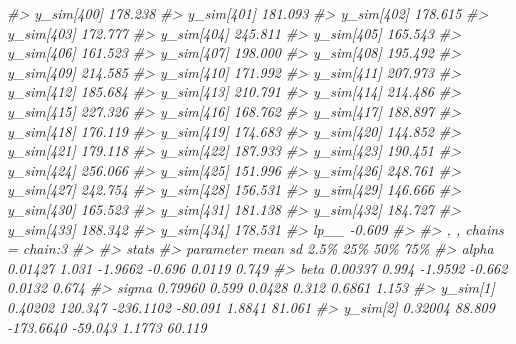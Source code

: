 \documentclass[
  10pt,
  italian,
  a4paper,
  extrafontsizes,onecolumn,openright
  ]{memoir}
\newenvironment{Shaded}{\begin{snugshade}}{\end{snugshade}}
\newcommand{\CommentTok}[1]{\textcolor[rgb]{0.56,0.35,0.01}{\textit{#1}}}
\begin{document}
\begin{Shaded}
\begin{Highlighting}[]
\CommentTok{\#\textgreater{}   y\_sim[400] 178.238}
\CommentTok{\#\textgreater{}   y\_sim[401] 181.093}
\CommentTok{\#\textgreater{}   y\_sim[402] 178.615}
\CommentTok{\#\textgreater{}   y\_sim[403] 172.777}
\CommentTok{\#\textgreater{}   y\_sim[404] 245.811}
\CommentTok{\#\textgreater{}   y\_sim[405] 165.543}
\CommentTok{\#\textgreater{}   y\_sim[406] 161.523}
\CommentTok{\#\textgreater{}   y\_sim[407] 198.000}
\CommentTok{\#\textgreater{}   y\_sim[408] 195.492}
\CommentTok{\#\textgreater{}   y\_sim[409] 214.585}
\CommentTok{\#\textgreater{}   y\_sim[410] 171.992}
\CommentTok{\#\textgreater{}   y\_sim[411] 207.973}
\CommentTok{\#\textgreater{}   y\_sim[412] 185.684}
\CommentTok{\#\textgreater{}   y\_sim[413] 210.791}
\CommentTok{\#\textgreater{}   y\_sim[414] 214.486}
\CommentTok{\#\textgreater{}   y\_sim[415] 227.326}
\CommentTok{\#\textgreater{}   y\_sim[416] 168.762}
\CommentTok{\#\textgreater{}   y\_sim[417] 188.897}
\CommentTok{\#\textgreater{}   y\_sim[418] 176.119}
\CommentTok{\#\textgreater{}   y\_sim[419] 174.683}
\CommentTok{\#\textgreater{}   y\_sim[420] 144.852}
\CommentTok{\#\textgreater{}   y\_sim[421] 179.118}
\CommentTok{\#\textgreater{}   y\_sim[422] 187.933}
\CommentTok{\#\textgreater{}   y\_sim[423] 190.451}
\CommentTok{\#\textgreater{}   y\_sim[424] 256.066}
\CommentTok{\#\textgreater{}   y\_sim[425] 151.996}
\CommentTok{\#\textgreater{}   y\_sim[426] 248.761}
\CommentTok{\#\textgreater{}   y\_sim[427] 242.754}
\CommentTok{\#\textgreater{}   y\_sim[428] 156.531}
\CommentTok{\#\textgreater{}   y\_sim[429] 146.666}
\CommentTok{\#\textgreater{}   y\_sim[430] 165.523}
\CommentTok{\#\textgreater{}   y\_sim[431] 181.138}
\CommentTok{\#\textgreater{}   y\_sim[432] 184.727}
\CommentTok{\#\textgreater{}   y\_sim[433] 188.342}
\CommentTok{\#\textgreater{}   y\_sim[434] 178.531}
\CommentTok{\#\textgreater{}   lp\_\_        {-}0.609}
\CommentTok{\#\textgreater{} }
\CommentTok{\#\textgreater{} , , chains = chain:3}
\CommentTok{\#\textgreater{} }
\CommentTok{\#\textgreater{}             stats}
\CommentTok{\#\textgreater{} parameter        mean      sd      2.5\%     25\%     50\%    75\%}
\CommentTok{\#\textgreater{}   alpha       0.01427   1.031   {-}1.9662  {-}0.696  0.0119  0.749}
\CommentTok{\#\textgreater{}   beta        0.00337   0.994   {-}1.9592  {-}0.662  0.0132  0.674}
\CommentTok{\#\textgreater{}   sigma       0.79960   0.599    0.0428   0.312  0.6861  1.153}
\CommentTok{\#\textgreater{}   y\_sim[1]    0.40202 120.347 {-}236.1102 {-}80.091  1.8841 81.061}
\CommentTok{\#\textgreater{}   y\_sim[2]    0.32004  88.809 {-}173.6640 {-}59.043  1.1773 60.119}

\end{Highlighting}
\end{Shaded}
\end{document}
